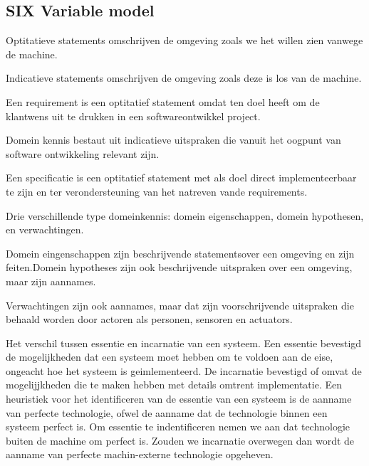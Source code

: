 \subsection{SIX Variable model}
Optitatieve statements omschrijven de omgeving zoals we het willen zien vanwege de machine. 

Indicatieve statements omschrijven de omgeving zoals deze is los van de machine. 

Een requirement is een optitatief statement omdat ten doel heeft om de klantwens uit te drukken in een softwareontwikkel project. 

Domein kennis bestaut uit indicatieve uitspraken die vanuit het oogpunt van software ontwikkeling relevant zijn. 

Een specificatie is een optitatief statement met als doel direct implementeerbaar te zijn en ter verondersteuning van het natreven vande requirements. 

Drie verschillende type domeinkennis: domein eigenschappen, domein hypothesen, en verwachtingen. 

Domein eingenschappen  zijn beschrijvende statementsover een omgeving en zijn feiten.Domein hypotheses  zijn ook beschrijvende uitspraken over een omgeving, maar zijn aannames. 

Verwachtingen zijn ook aannames, maar dat zijn voorschrijvende uitspraken die behaald worden door actoren als personen, sensoren en actuators. 

Het verschil tussen essentie en incarnatie van een systeem. Een essentie bevestigd de  mogelijkheden dat een systeem moet hebben om te voldoen aan de eise, ongeacht hoe het systeem is geimlementeerd. De incarnatie bevestigd of omvat de mogelijjkheden die te maken hebben met details omtrent implementatie. Een heuristiek voor het identificeren van de essentie van een systeem is de aanname van perfecte technologie, ofwel de aanname dat de technologie binnen een systeem perfect is. Om essentie te indentificeren nemen we aan dat technologie buiten de machine om perfect is. Zouden we incarnatie overwegen dan wordt de aanname van perfecte machin-externe technologie opgeheven. 


